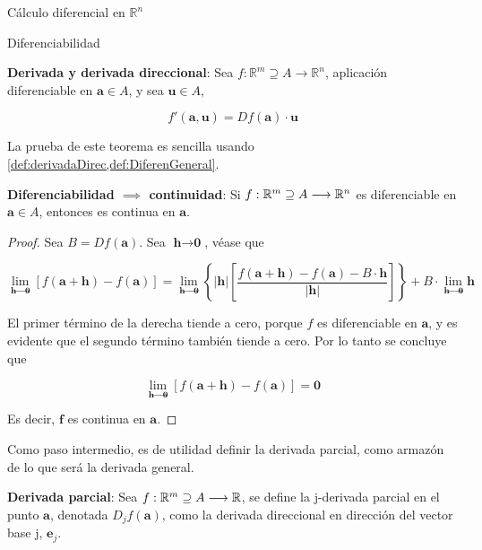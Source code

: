 \begin{chapter}{Cálculo diferencial en $\mathbb{R}^n$}
\begin{section}{Diferenciabilidad}
\begin{them}
\label{them:DerivYDerivDirec}
\textbf{Derivada y derivada direccional}: Sea $f:\mathbb{R}^m\supseteq A \longrightarrow \mathbb{R}^n$, aplicación diferenciable en $\textbf{a} \in A$, y sea $\textbf{u} \in A$,

\begin{equation*}
f'(\textbf{a}, \textbf{u}) = Df(\textbf{a})\cdot\textbf{u}
\end{equation*}

La prueba de este teorema es sencilla usando \cref{def:derivadaDirec,def:DiferenGeneral}.
\end{them}

\begin{them}
\label{them:DiferenContinui}
\textbf{Diferenciabilidad $\implies$ continuidad}:  Si $f: \mathbb{R}^m \supseteq A \longrightarrow \mathbb{R}^n$ es diferenciable en $\textbf{a} \in A$, entonces es continua en $\textbf{a}$.
\end{them}

\begin{proof}
Sea $B=Df(\textbf{a})$. Sea $\textbf{h} \longrightarrow \textbf{0}$, véase que

\begin{equation*}
    \lim_{\textbf{h}\rightarrow\textbf{0}} \left[ f(\textbf{a}+\textbf{h}) - f(\textbf{a}) \right]= \lim_{\textbf{h}\rightarrow\textbf{0}} \left\{ |\textbf{h}| \left[ \frac{f(\textbf{a}+\textbf{h}) - f(\textbf{a}) - B \cdot \textbf{h}}{|\textbf{h}|} \right]\right\} + B\cdot \lim_{\textbf{h}\rightarrow\textbf{0}} \textbf{h}
\end{equation*}

El primer término de la derecha tiende a cero, porque $f$ es diferenciable en $\textbf{a}$, y es evidente que el segundo término también tiende a cero. Por lo tanto se concluye que

\begin{equation*}
    \lim_{\textbf{h}\rightarrow\textbf{0}} \left[ f(\textbf{a}+\textbf{h}) - f(\textbf{a}) \right]=\textbf{0}
\end{equation*}

Es decir, $\textbf{f}$ es continua en $\textbf{a}$.

\end{proof}

Como paso intermedio, es de utilidad definir la derivada parcial, como armazón de lo que será la derivada general.

\begin{defn}
\label{def:DerivParcial}
\textbf{Derivada parcial}: Sea $f: \mathbb{R}^m \supseteq A \longrightarrow \mathbb{R}$, se define la j-derivada parcial en el punto $\textbf{a}$, denotada $D_jf(\textbf{a})$, como la derivada direccional en dirección del vector base j, $\textbf{e}_j$.


\end{defn}
\end{section}
\end{chapter}
